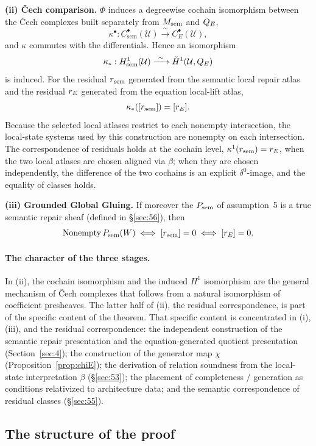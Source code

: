 \begin{theorem}
\textbf{(ii) \v{C}ech comparison.} $\Phi$ induces a degreewise cochain
isomorphism between the \v{C}ech complexes built separately from
$M_{\mathrm{sem}}$ and $Q_{E}$,
\[
\kappa^\bullet:
C^\bullet_{\mathrm{sem}}(\mathcal U)
\xrightarrow{\ \sim\ }
C^\bullet_E(\mathcal U),
\]
and $\kappa$ commutes with the differentials. Hence an isomorphism
\[
\kappa_*:
H^1_{\mathrm{sem}}(\mathcal U)
\xrightarrow{\ \sim\ }
\check H^1(\mathcal U,Q_{E})
\]
is induced. For the residual $r_{\mathrm{sem}}$ generated from the semantic local
repair atlas and the residual $r_{E}$ generated from the equation
local-lift atlas,
\[
\kappa_*([r_{\mathrm{sem}}])=[r_{E}].
\]
Because the selected local atlases restrict to each nonempty
intersection, the local-state systems used by this construction are
nonempty on each intersection. The correspondence of residuals holds at the
cochain level, $\kappa^1(r_{\mathrm{sem}})=r_{E}$, when the two local atlases are
chosen aligned via $\beta$; when they are chosen independently, the
difference of the two cochains is an explicit $\delta^0$-image, and the
equality of classes holds.

\textbf{(iii) Grounded Global Gluing.} If moreover the $P_{\mathrm{sem}}$ of
assumption~5 is a true semantic repair sheaf (defined in
\S\ref{sec:56}), then
\[
\mathrm{Nonempty}\,P_{\mathrm{sem}}(W)
\iff
[r_{\mathrm{sem}}]=0
\iff
[r_{E}]=0.
\]
\end{theorem}

\paragraph{The character of the three stages.}
In (ii), the cochain isomorphism and the induced $H^1$ isomorphism are
the general mechanism of \v{C}ech complexes that follows from a natural
isomorphism of coefficient presheaves. The latter half of (ii), the
residual correspondence, is part of the specific content of the theorem.
That specific content is concentrated in (i), (iii), and the residual
correspondence: the independent construction of the semantic repair
presentation and the equation-generated quotient presentation
(Section~\ref{sec:4}); the construction of the generator map $\chi$
(Proposition~\ref{prop:chiE}); the derivation of relation soundness
from the local-state interpretation $\beta$ (\S\ref{sec:53}); the
placement of completeness / generation as conditions relativized to
architecture data; and the semantic correspondence of residual classes
(\S\ref{sec:55}).

\subsection{The structure of the proof}\label{sec:52}

